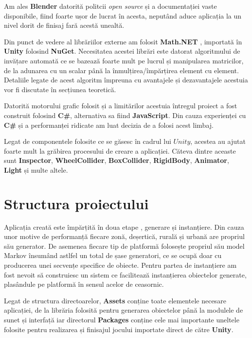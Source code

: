 Am ales \textbf{Blender} datorită politcii \textit{open source} și a documentației vaste disponibile, fiind foarte ușor de lucrat în acesta, neputând aduce aplicația la un nivel dorit de finisaj fară acestă unealtă.\par

Din punct de vedere al librăriilor externe am folosit \textbf{Math.NET} , importată în \textbf{Unity} folosind \textbf{NuGet}. Necesitatea acestei librări este datorat algoritmului de invățare automată ce se bazează foarte mult pe lucrul și manipularea matricilor, de la adunarea cu un scalar până la înmulțirea/împărțirea element cu element. Detaliile legate de acest algoritm împreuna cu avantajele și dezavantajele acestuia vor fi discutate în secțiunea teoretică.\par

Datorită motorului grafic folosit și a limitărilor acestuia întregul proiect a fost construit folosind \textbf{C\#}, alternativa sa fiind \textbf{JavaScript}. Din cauza experienței cu \textbf{C\#} și a performanței ridicate am luat decizia de a folosi acest limbaj.\par

Legat de componentele folosite ce se găsesc în cadrul lui $Unity$, acestea au ajutat foarte mult la grăbirea procesului de creare a aplicației. Căteva dintre aceaste sunt \textbf{Inspector}, \textbf{WheelCollider}, \textbf{BoxCollider}, \textbf{RigidBody}, \textbf{Animator}, \textbf{Light} și multe altele.\par

\section{Structura proiectului}

Aplicația creată este împărțită în doua etape , generare și instanțiere. Din cauza unor motive de performanță fiecare zonă, deșertică, rurală și urbană are propriul său generator. De asemenea fiecare tip de platformă folosește propriul său model Markov însumând astlfel un total de șase generatori, ce se ocupă doar cu producerea unei secvențe specifice de obiecte. Pentru partea de instanțiere am fost nevoit să construiesc un sistem ce facilitează instanțierea obiectelor generate, plasândule pe platformă în sensul acelor de ceasornic.\par

Legat de structura directoarelor, \textbf{Assets} conține toate elementele necesare aplicației, de la librăria folosită pentru generarea obiectelor până la modulele de sunet și interfață iar directorul \textbf{Packages} conține cele mai importante uneltele folosite pentru realizarea și finisajul jocului importate direct de către \textbf{Unity}.\par

